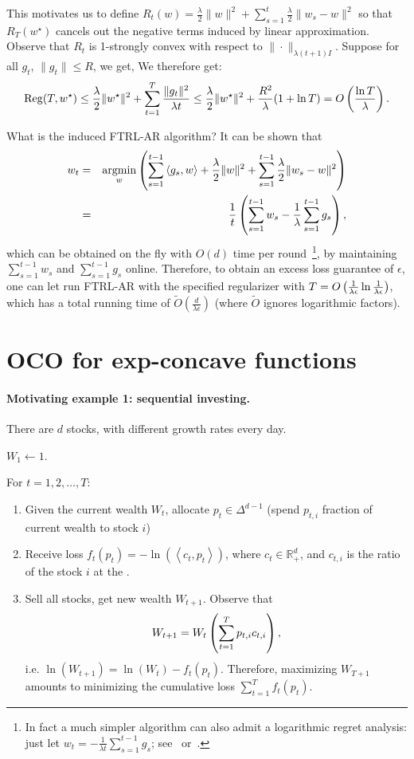 \documentclass{article}
\DeclareMathOperator*{\Reg}{{\rm Reg}}
\DeclareMathOperator*{\argmin}{{\rm argmin}}
\newcommand{\RR}{\mathbb{R}} %
\newcommand{\inner}[2]{\left\langle #1,#2 \right\rangle}
\begin{document}
This motivates us to define $R_t(w) = \frac\lambda 2\| w \|^2 + \sum_{s=1}^t \frac\lambda 2\| w_s - w \|^2$ so that $R_T(w^\star)$ cancels out the negative terms induced by linear approximation.
Observe that $R_t$ is 1-strongly convex with respect to $\| \cdot \|_{\lambda(t+1) I}$.
Suppose for all $g_t$, $\| g_t \| \leq R$, we get,
We therefore get:
\[ \Reg(T, w^\star) \leq \frac{\lambda}{2}\|w^\star\|^2 + \sum_{t=1}^T \frac{\| g_t \|^2}{\lambda t} \leq \frac{\lambda}{2}\|w^\star\|^2 + \frac{R^2}{\lambda}(1 + \ln T) = O\del{\frac{\ln T}{\lambda}}. \]

What is the induced FTRL-AR algorithm? It can be shown that
\begin{eqnarray*}
  w_t &=& \argmin_w \del{ \sum_{s=1}^{t-1} \inner{g_s}{w} + \frac\lambda 2\| w \|^2 + \sum_{s=1}^{t-1} \frac\lambda 2\| w_s - w \|^2} \\
  &=& \frac{1}{t} \del{\sum_{s=1}^{t-1} w_s - \frac1\lambda \sum_{s=1}^{t-1} g_s},
\end{eqnarray*}
which can be obtained on the fly with $O(d)$ time per round~\footnote{In fact a much simpler algorithm can also admit a logarithmic regret analysis: just let $w_t = -\frac{1}{\lambda t} \sum_{s=1}^{t-1} g_s$; see~\cite[][Theorem 1]{hazan2007logarithmic} or~\cite[][Section 14.4.4 and 14.5.3]{shalev2014understanding}.}, by maintaining $\sum_{s=1}^{t-1} w_s$ and $\sum_{s=1}^{t-1} g_s$ online. Therefore, to obtain an excess loss guarantee of $\epsilon$, one can let run FTRL-AR with the specified regularizer with $T = O\del{ \frac{1}{\lambda\epsilon}\ln\frac{1}{\lambda\epsilon}}$, which has a total running time of $\tilde{O}(\frac{d}{\lambda \epsilon})$
(where $\tilde{O}$ ignores logarithmic factors).


\section{OCO for exp-concave functions}

\paragraph{Motivating example 1: sequential investing.} There are $d$ stocks, with different growth rates every day.

$W_1 \gets 1$.

For $t = 1,2,\ldots,T$:
\begin{enumerate}
\item Given the current wealth $W_t$, allocate $p_t \in \Delta^{d-1}$ (spend $p_{t,i}$ fraction of current wealth to stock $i$)
\item Receive loss $f_t(p_t) = -\ln(\inner{c_t}{p_t})$, where $c_t \in \RR^d_+$, and $c_{t,i}$ is the ratio of the stock $i$ at the .
\item Sell all stocks, get new wealth $W_{t+1}$. Observe that
\[ W_{t+1} = W_t \del{\sum_{t=1}^T p_{t,i} c_{t,i}}, \]
i.e. $\ln(W_{t+1}) = \ln(W_t) - f_t(p_t)$. Therefore, maximizing $W_{T+1}$ amounts to minimizing the cumulative loss $\sum_{t=1}^T f_t(p_t)$.
\end{enumerate}
\end{document}
